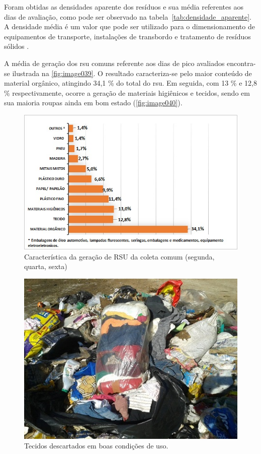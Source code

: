 		
	Foram obtidas as densidades aparente dos resíduos e sua média referentes aos dias de avaliação, como pode ser observado na tabela~\ref{tab:densidade_aparente}. A densidade média é um valor que pode ser utilizado para o dimensionamento de equipamentos de transporte, instalações de transbordo e tratamento de resíduos sólidos \cite{ibam:2001}.

	
	
	A média de geração dos \gls{rsu} comuns referente aos dias de pico avaliados encontra-se ilustrada na \autoref{fig:image039}. O resultado caracteriza-se pelo maior conteúdo de material orgânico, atingindo 34,1 \% do total do \gls{rsu}. Em seguida, com 13 \% e 12,8 \% respectivamente, ocorre a geração de materiais higiênicos e tecidos, sendo em sua maioria roupas ainda em bom estado (\autoref{fig:image040}). 
	
	\begin{figure}
		\centering
		\includegraphics[width=1\linewidth]{produtos/prodtres/image039}
		\caption{Característica da geração de RSU da coleta comum (segunda, quarta, sexta)}
		\label{fig:image039}
	\end{figure}
	
	
\begin{figure}
	\centering
	\includegraphics[width=0.7\linewidth]{produtos/prodtres/image040}
	\caption{Tecidos descartados em boas condições de uso.}
	\label{fig:image040}
\end{figure}


